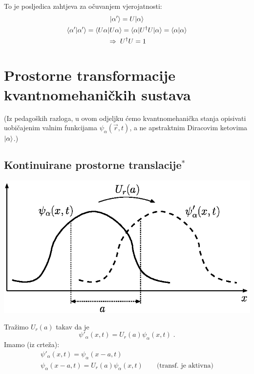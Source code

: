 To je posljedica zahtjeva za očuvanjem vjerojatnosti: 
\begin{gather*}
| \alpha' \rangle=U| \alpha \rangle \\
\langle \alpha' |\alpha'\rangle = \langle U\alpha |U\alpha\rangle =
 \langle \alpha |U^{\dagger}U| \alpha \rangle = \langle \alpha |\alpha\rangle \\
\;\Rightarrow\; U^{\dagger}U=1
\end{gather*}

\section{Prostorne transformacije kvantnomehaničkih sustava}

(Iz pedagoških razloga, u ovom odjeljku ćemo kvantnomehanička stanja 
opisivati uobičajenim valnim funkcijama $\psi_{\alpha}(\vec{r},t)$, a ne
apstraktnim Diracovim ketovima $| \alpha \rangle$.)

\subsection{Kontinuirane prostorne translacije$^*$}

\centerline{\includegraphics{pics/qmtranslacija.eps}}

Tražimo $U_{r}(a)$ takav da je
\begin{displaymath}
  \psi'_{\alpha}(x,t)= U_{r}(a)\psi_{\alpha}(x,t) \;.
\end{displaymath}
Imamo (iz crteža):
\begin{gather}
 \psi'_{\alpha}(x,t)=\psi_{\alpha}(x-a,t) \\
 \psi_{\alpha}(x-a,t)=U_{r}(a)\psi_{\alpha}(x,t) \qquad \text{(transf. je
  aktivna)} \label{optrans}
\end{gather}

